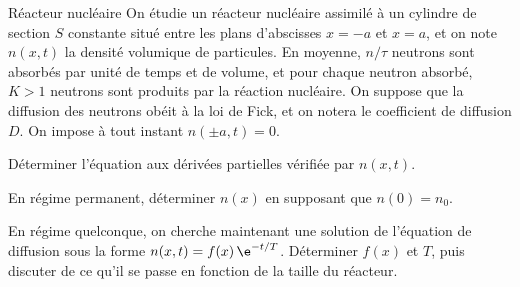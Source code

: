 \begin{exo}[PC]{Réacteur nucléaire}
On étudie un réacteur nucléaire assimilé à un cylindre de section $S$ constante situé entre les plans d'abscisses $x=-a$ et $x=a$, et on note $n(x,t)$ la densité volumique de particules. En moyenne, $n/\tau$ neutrons sont absorbés par unité de temps et de volume, et pour chaque neutron absorbé, $K>1$ neutrons sont produits par la réaction nucléaire. On suppose que la diffusion des neutrons obéit à la loi de Fick, et on notera le coefficient de diffusion $D$. On impose à tout instant $n(\pm a,t)=0$.

\begin{quest}
\item Déterminer l'équation aux dérivées partielles vérifiée par $n(x,t)$.
\item En régime permanent, déterminer $n(x)$ en supposant que $n(0)=n_{0}$.
\item En régime quelconque, on cherche maintenant une solution de l'équation de diffusion sous la forme $n(x,t)=f(x)\,\e^{-t/T}$. Déterminer $f(x)$ et $T$, puis discuter de ce qu'il se passe en fonction de la taille du réacteur.
\end{quest}
\end{exo}

